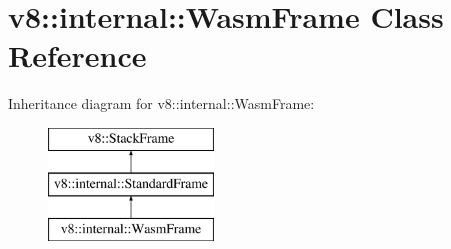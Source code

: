 \hypertarget{classv8_1_1internal_1_1_wasm_frame}{}\section{v8\+:\+:internal\+:\+:Wasm\+Frame Class Reference}
\label{classv8_1_1internal_1_1_wasm_frame}
Inheritance diagram for v8\+:\+:internal\+:\+:Wasm\+Frame\+:\begin{figure}[H]
\begin{center}
\leavevmode
\includegraphics[height=3.000000cm]{classv8_1_1internal_1_1_wasm_frame}
\end{center}
\end{figure}
